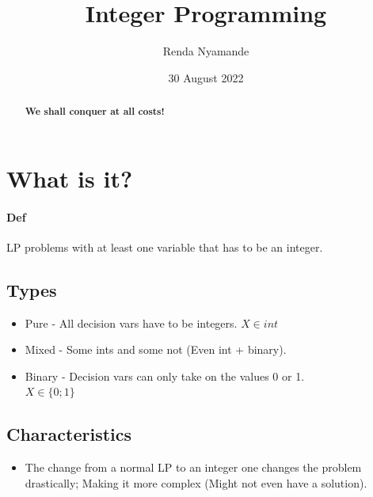 \documentclass[12pt, a4paper]{article}
\title{Integer Programming}
\author{Renda Nyamande}
\date{30 August 2022}
\begin{document}
\maketitle

\begin{abstract}
    \begin{center}
        \textbf{We shall conquer at all costs!}
    \end{center}
\end{abstract}
\pagebreak

\section*{What is it?}
\paragraph*{Def}
LP problems with at least one variable that has to be an integer.
\subsection*{Types}
\begin{itemize}
    \item Pure - All decision vars have to be integers.
        \begin{math}
            X\in int
        \end{math}
    \item Mixed - Some ints and some not (Even int + binary).
    \item Binary - Decision vars can only take on the values 0 or 1.\\
        \begin{math}
            X\in\{0;1\}
        \end{math}
\end{itemize}
\subsection*{Characteristics}
\begin{itemize}
    \item The change from a normal LP to an integer one changes the problem drastically; Making it more complex (Might not even have a solution).
\end{itemize}
\end{document}
